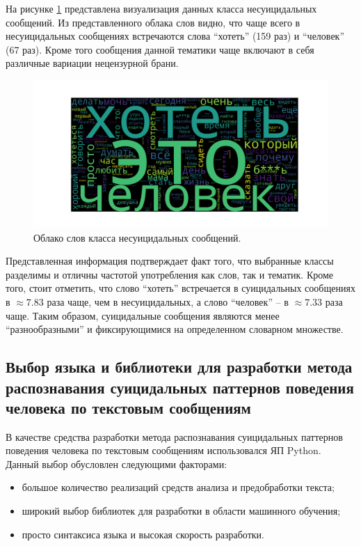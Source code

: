 На рисунке \ref{img:cloud2} представлена визуализация данных класса несуицидальных сообщений. Из представленного облака слов видно, что чаще всего в несуицидальных сообщениях встречаются слова ``хотеть'' (159 раз) и ``человек'' (67 раз). Кроме того сообщения данной тематики чаще включают в себя различные вариации нецензурной брани.

\begin{figure}[H]
	\centering
	\includegraphics[width=\textwidth]{inc/cloudNonSuicidal.pdf}
	\caption{ Облако слов класса несуицидальных сообщений. }
	\label{img:cloud2}
\end{figure}

Представленная информация подтверждает факт того, что выбранные классы разделимы и отличны частотой употребления как слов, так и тематик. Кроме того, стоит отметить, что слово ``хотеть'' встречается в суицидальных сообщениях в $\approx 7.83$ раза чаще, чем в несуицидальных, а слово ``человек'' -- в $\approx 7.33$ раза чаще. Таким образом, суицидальные сообщения являются менее ``разнообразными'' и фиксирующимися на определенном словарном множестве.

\subsection{Выбор языка и библиотеки для разработки метода распознавания суицидальных паттернов поведения человека по текстовым сообщениям}

В качестве средства разработки метода распознавания суицидальных паттернов поведения человека по текстовым сообщениям использовался ЯП Python. Данный выбор обусловлен следующими факторами:

\begin{itemize}
	\item большое количество реализаций средств анализа и предобработки текста;
	\item широкий выбор библиотек для разработки в области машинного обучения;
	\item просто синтаксиса языка и высокая скорость разработки.
\end{itemize}

